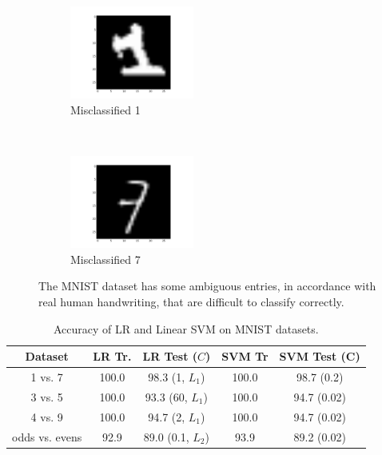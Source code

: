 \begin{figure}\label{fig:misclassified}
    \centering
    \begin{subfigure}[b]{0.5\columnwidth}
        \centering
        \includegraphics[height=1.2in]{figures/4_1_bad1}
        \caption{Misclassified 1}
    \end{subfigure}%
    ~ 
    \begin{subfigure}[b]{0.5\columnwidth}
        \centering
        \includegraphics[height=1.2in]{figures/4_1_bad7}
        \caption{Misclassified 7}
    \end{subfigure}
    \caption{The MNIST dataset has some ambiguous entries, in accordance with real human handwriting, that are difficult to classify correctly.}
\end{figure}

\begin{table}[ht!]
\centering
\begin{tabular}{||c c c c c||}  
 \hline
 Dataset & LR Tr. & LR Test ($C$) & SVM Tr & SVM Test (C) \\ [0.3ex] 
 \hline\hline
 1 vs. 7 & 100.0 & 98.3 (1, $L_1$) & 100.0 & 98.7 (0.2) \\ 
 \hline
 3 vs. 5 & 100.0 & 93.3 (60, $L_1$) & 100.0 & 94.7 (0.02) \\ 
 \hline
 4 vs. 9 & 100.0 & 94.7 (2, $L_1$) & 100.0 & 94.7 (0.02) \\ 
 \hline
 odds vs. evens & 92.9 & 89.0 (0.1, $L_2$) & 93.9 & 89.2 (0.02) \\ 
 \hline
\end{tabular}
\caption{Accuracy of LR and Linear SVM on MNIST datasets.}
\label{table_4_1}
\end{table}


